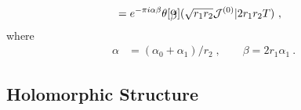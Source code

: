 \documentclass[11pt]{article}
\numberwithin{equation}{section}
\begin{document}
\begin{appendix}
\begin{align}
& = e^{-\pi i\alpha\beta}\theta \! \begin{bmatrix} \vspace{-20pt} \\ \alpha \\ \vspace{-20pt} \\ \beta \\ \vspace{-20pt} \end{bmatrix} \! ( \sqrt{r_1r_2}\mathcal{J}^{(0)} |2 r_1r_2T )\ ,
\end{align}
where
\begin{align}
\alpha &= (\alpha_0+\alpha_1)/r_2\;,	\qquad \beta = 2r_1\alpha_1\ .
\end{align}


\subsection{Holomorphic Structure}\label{app:holo}
  

\end{appendix}
\end{document}
